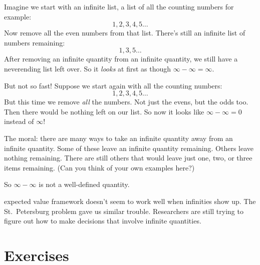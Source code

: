 \documentclass[justified]{tufte-book}
\theoremstyle{definition}
\theoremstyle{definition}
\theoremstyle{definition}
\theoremstyle{remark}
\begin{document}
Imagine we start with an infinite list, a list of all the counting numbers for example:
\[ 1, 2, 3, 4, 5 \ldots \]
Now remove all the even numbers from that list. There's still an infinite list of numbers remaining:
\[ 1, 3, 5 \ldots \]
After removing an infinite quantity from an infinite quantity, we still have a neverending list left over. So it \emph{looks} at first as though \(\infty - \infty = \infty\).

But not so fast! Suppose we start again with all the counting numbers:
\[ 1, 2, 3, 4, 5 \ldots \]
But this time we remove \emph{all} the numbers. Not just the evens, but the odds too. Then there would be nothing left on our list. So now it looks like \(\infty - \infty = 0\) instead of \(\infty\)!

The moral: there are many ways to take an infinite quantity away from an infinite quantity. Some of these leave an infinite quantity remaining. Others leave nothing remaining. There are still others that would leave just one, two, or three items remaining. (Can you think of your own examples here?)

So \(\infty - \infty\) is not a well-defined quantity.

 expected value framework doesn't seem to work well when infinities show up. The St.~Petersburg problem gave us similar trouble. Researchers are still trying to figure out how to make decisions that involve infinite quantities.

\hypertarget{exercises-11}{%
\section*{Exercises}\label{exercises-11}}
\end{document}
